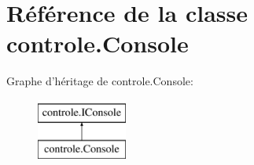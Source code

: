 \hypertarget{classcontrole_1_1_console}{\section{Référence de la classe controle.\-Console}
\label{classcontrole_1_1_console}
}
Graphe d'héritage de controle.\-Console\-:\begin{figure}[H]
\begin{center}
\leavevmode
\includegraphics[height=2.000000cm]{classcontrole_1_1_console}
\end{center}
\end{figure}
